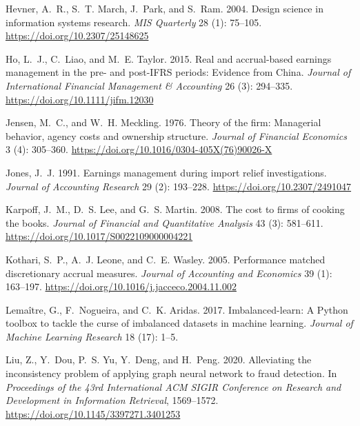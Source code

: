 \documentclass[12pt]{article}
\begin{document}
\begin{thebibliography}{}
Hevner, A.~R., S.~T. March, J.~Park, and S.~Ram. 2004.
\newblock Design science in information systems research.
\newblock \textit{MIS Quarterly} 28 (1): 75--105.
  \url{https://doi.org/10.2307/25148625}

Ho, L.~J., C.~Liao, and M.~E. Taylor. 2015.
\newblock Real and accrual-based earnings management in the pre- and post-IFRS
  periods: Evidence from China.
\newblock \textit{Journal of International Financial Management \& Accounting}
  26 (3): 294--335.
  \url{https://doi.org/10.1111/jifm.12030}

Jensen, M.~C., and W.~H. Meckling. 1976.
\newblock Theory of the firm: Managerial behavior, agency costs and ownership
  structure.
\newblock \textit{Journal of Financial Economics} 3 (4): 305--360.
  \url{https://doi.org/10.1016/0304-405X(76)90026-X}

Jones, J.~J. 1991.
\newblock Earnings management during import relief investigations.
\newblock \textit{Journal of Accounting Research} 29 (2): 193--228.
  \url{https://doi.org/10.2307/2491047}

Karpoff, J.~M., D.~S. Lee, and G.~S. Martin. 2008.
\newblock The cost to firms of cooking the books.
\newblock \textit{Journal of Financial and Quantitative Analysis} 43 (3):
  581--611.
  \url{https://doi.org/10.1017/S0022109000004221}

Kothari, S.~P., A.~J. Leone, and C.~E. Wasley. 2005.
\newblock Performance matched discretionary accrual measures.
\newblock \textit{Journal of Accounting and Economics} 39 (1): 163--197.
  \url{https://doi.org/10.1016/j.jacceco.2004.11.002}

Lemaître, G., F.~Nogueira, and C.~K. Aridas. 2017.
\newblock Imbalanced-learn: A Python toolbox to tackle the curse of
  imbalanced datasets in machine learning.
\newblock \textit{Journal of Machine Learning Research} 18 (17): 1--5.

Liu, Z., Y.~Dou, P.~S. Yu, Y.~Deng, and H.~Peng. 2020.
\newblock Alleviating the inconsistency problem of applying graph neural
  network to fraud detection.
\newblock In \textit{Proceedings of the 43rd International ACM SIGIR Conference
  on Research and Development in Information Retrieval}, 1569--1572.
  \url{https://doi.org/10.1145/3397271.3401253}


\end{thebibliography}
\end{document}
